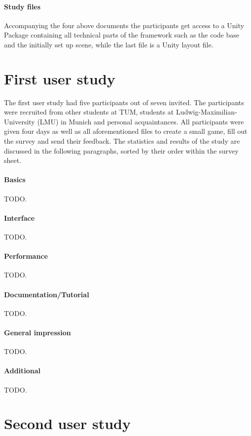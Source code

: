 \paragraph{Study files} Accompanying the four above documents the participants get access to a Unity Package containing all technical parts of the framework such as the code base and the initially set up scene, while the last file is a Unity layout file. 

\section{First user study}
The first user study had five participants out of seven invited. The participants were recruited from other students at TUM, students at Ludwig-Maximilian-University (LMU) in Munich and personal acquaintances. All participants were given four days as well as all aforementioned files to create a small game, fill out the survey and send their feedback. The statistics and results of the study are discussed in the following paragraphs, sorted by their order within the survey sheet.
\paragraph{Basics} TODO.
\paragraph{Interface} TODO.
\paragraph{Performance} TODO.
\paragraph{Documentation/Tutorial} TODO.
\paragraph{General impression} TODO.
\paragraph{Additional} TODO.

\section{Second user study}
